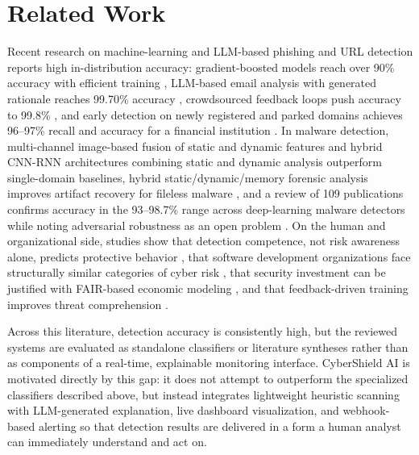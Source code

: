 \documentclass[conference]{IEEEtran}
\begin{document}
\section{Related Work}
Recent research on machine-learning and LLM-based phishing and URL detection reports high in-distribution accuracy: gradient-boosted models reach over 90\% accuracy with efficient training \cite{misiek2026xgboost}, LLM-based email analysis with generated rationale reaches 99.70\% accuracy \cite{koide2026chatspamdetector}, crowdsourced feedback loops push accuracy to 99.8\% \cite{aldhuwayhi2026dynamic}, and early detection on newly registered and parked domains achieves 96--97\% recall and accuracy for a financial institution \cite{duarte2025machine}. In malware detection, multi-channel image-based fusion of static and dynamic features \cite{elgarduh2026hybrid} and hybrid CNN-RNN architectures combining static and dynamic analysis \cite{gutierrez2024application} outperform single-domain baselines, hybrid static/dynamic/memory forensic analysis improves artifact recovery for fileless malware \cite{kara2026hap}, and a review of 109 publications confirms accuracy in the 93--98.7\% range across deep-learning malware detectors while noting adversarial robustness as an open problem \cite{alshoulie2025deep}. On the human and organizational side, studies show that detection competence, not risk awareness alone, predicts protective behavior \cite{almarwani2026ai}, that software development organizations face structurally similar categories of cyber risk \cite{khattak2026cyber}, that security investment can be justified with FAIR-based economic modeling \cite{he2026enhancing}, and that feedback-driven training improves threat comprehension \cite{abril2025exploring}.

Across this literature, detection accuracy is consistently high, but the reviewed systems are evaluated as standalone classifiers or literature syntheses rather than as components of a real-time, explainable monitoring interface. CyberShield AI is motivated directly by this gap: it does not attempt to outperform the specialized classifiers described above, but instead integrates lightweight heuristic scanning with LLM-generated explanation, live dashboard visualization, and webhook-based alerting so that detection results are delivered in a form a human analyst can immediately understand and act on.
\end{document}
